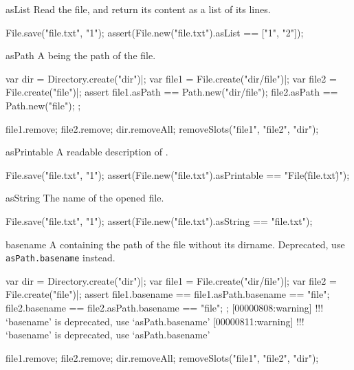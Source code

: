 \begin{urbiscriptapi}
\item[asList]
  Read the file, and return its content as a list of its lines.
\begin{urbiscript}
File.save("file.txt", "1\n");
assert(File.new("file.txt").asList == ["1", "2"]);
\end{urbiscript}


\item[asPath] A  being the path of the file.
\begin{urbiscript}
var dir = Directory.create("dir")|;
var file1 = File.create("dir/file")|;
var file2 = File.create("file")|;
assert
{
  file1.asPath == Path.new("dir/file");
  file2.asPath == Path.new("file");
};
\end{urbiscript}
\begin{urbicomment}
file1.remove;
file2.remove;
dir.removeAll;
removeSlots("file1", "file2", "dir");
\end{urbicomment}


\item[asPrintable]
  A readable description of \this.
\begin{urbiscript}
File.save("file.txt", "1\n");
assert(File.new("file.txt").asPrintable == "File(\"file.txt\")");
\end{urbiscript}


\item[asString]
  The name of the opened file.
\begin{urbiscript}
File.save("file.txt", "1\n");
assert(File.new("file.txt").asString == "file.txt");
\end{urbiscript}


\item[basename] A  containing the path of the file without
  its dirname.  Deprecated, use \lstinline|asPath.basename| instead.
\begin{urbiscript}
var dir = Directory.create("dir")|;
var file1 = File.create("dir/file")|;
var file2 = File.create("file")|;
assert
{
  file1.basename == file1.asPath.basename == "file";
  file2.basename == file2.asPath.basename == "file";
};
[00000808:warning] !!! `basename' is deprecated, use `asPath.basename'
[00000811:warning] !!! `basename' is deprecated, use `asPath.basename'
\end{urbiscript}
\begin{urbicomment}
file1.remove;
file2.remove;
dir.removeAll;
removeSlots("file1", "file2", "dir");
\end{urbicomment}



\end{urbiscriptapi}
